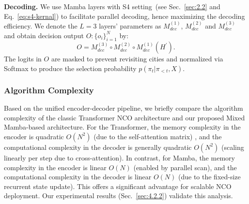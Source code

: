 \documentclass{article}
\theoremstyle{plain}
\theoremstyle{definition}
\theoremstyle{remark}
\begin{document}
\textbf{Decoding.} We use Mamba layers with S4 setting~(see Sec.~\ref{sec:2.2} and Eq.~\ref{eq:s4-kernal}) to facilitate parallel decoding, hence maximizing the decoding efficiency. We denote the $L=3$ layers' parameters as $M_{dec}^{(1)}$, $M_{dec}^{(2)}$ and $M_{dec}^{(3)}$ and obtain decision output $O:\{o_i\}_{i=1}^{N}$ by:
\begin{equation}
    O = M_{dec}^{(3)} \circ M_{dec}^{(2)} \circ M_{dec}^{(1)}(H^\prime).
\end{equation}
The logits in $O$ are masked to prevent revisiting cities and normalized via Softmax to produce the selection probability $p(\pi_t | \pi_{<t}, X)$.






\subsubsection{Algorithm Complexity}
Based on the unified encoder-decoder pipeline, we briefly compare the algorithm complexity of the classic Transformer NCO architecture and our proposed Mixed Mamba-based architecture. For the Transformer, the memory complexity in the encoder is quadratic $O(N^2)$ (due to the self-attention matrix) , and the computational complexity in the decoder is generally quadratic $O(N^2)$ (scaling linearly per step due to cross-attention). In contrast, for Mamba, the memory complexity in the encoder is linear $O(N)$ (enabled by parallel scan), and the computational complexity in the decoder is linear $O(N)$ (due to the fixed-size recurrent state update). This offers a significant advantage for scalable NCO deployment. Our experimental results (Sec.~\ref{sec:4.2.2}) validate this analysis.
\end{document}
